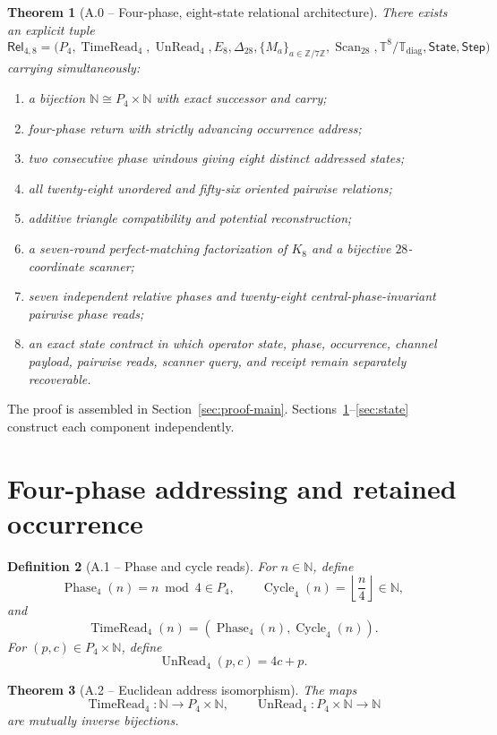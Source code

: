 \documentclass[11pt,letterpaper]{article}
\theoremstyle{relationstyle}
\newtheorem{theorem}{Theorem}[section]
\newtheorem{definition}[theorem]{Definition}
\newcommand{\N}{\mathbb{N}}
\newcommand{\Z}{\mathbb{Z}}
\newcommand{\T}{\mathbb{T}}
\newcommand{\Phase}{\operatorname{Phase}_4}
\newcommand{\Cycle}{\operatorname{Cycle}_4}
\newcommand{\TimeRead}{\operatorname{TimeRead}_4}
\newcommand{\UnRead}{\operatorname{UnRead}_4}
\newcommand{\Scan}{\operatorname{Scan}_{28}}
\newcommand{\State}{\mathsf{State}}
\newcommand{\Step}{\mathsf{Step}}
\newcommand{\diagT}{\T_{\mathrm{diag}}}
\newcommand{\Zseven}{\Z/7\Z}
\begin{document}
\begin{theorem}[A.0 -- Four-phase, eight-state relational architecture]\label{thm:main}
There exists an explicit tuple
\[
\mathsf{Rel}_{4,8}
=
\bigl(
P_4,\TimeRead,\UnRead,
E_8,\Delta_{28},
\{M_a\}_{a\in\Zseven},\Scan,
\T^8/\diagT,
\State,\Step
\bigr)
\]
carrying simultaneously:
\begin{enumerate}
  \item a bijection $\N\cong P_4\times\N$ with exact successor and carry;
  \item four-phase return with strictly advancing occurrence address;
  \item two consecutive phase windows giving eight distinct addressed states;
  \item all twenty-eight unordered and fifty-six oriented pairwise relations;
  \item additive triangle compatibility and potential reconstruction;
  \item a seven-round perfect-matching factorization of $K_8$ and a bijective $28$-coordinate scanner;
  \item seven independent relative phases and twenty-eight central-phase-invariant pairwise phase reads;
  \item an exact state contract in which operator state, phase, occurrence, channel payload, pairwise reads, scanner query, and receipt remain separately recoverable.
\end{enumerate}
\end{theorem}

The proof is assembled in Section~\ref{sec:proof-main}.  Sections~\ref{sec:phase}--\ref{sec:state} construct each component independently.

\section{Four-phase addressing and retained occurrence}\label{sec:phase}

\begin{definition}[A.1 -- Phase and cycle reads]
For $n\in\N$, define
\[
\Phase(n)=n\bmod4\in P_4,
\qquad
\Cycle(n)=\left\lfloor\frac n4\right\rfloor\in\N,
\]
and
\[
\TimeRead(n)=(\Phase(n),\Cycle(n)).
\]
For $(p,c)\in P_4\times\N$, define
\[
\UnRead(p,c)=4c+p.
\]
\end{definition}

\begin{theorem}[A.2 -- Euclidean address isomorphism]\label{thm:euclid}
The maps
\[
\TimeRead:\N\longrightarrow P_4\times\N,
\qquad
\UnRead:P_4\times\N\longrightarrow\N
\]
are mutually inverse bijections.
\end{theorem}
\end{document}
